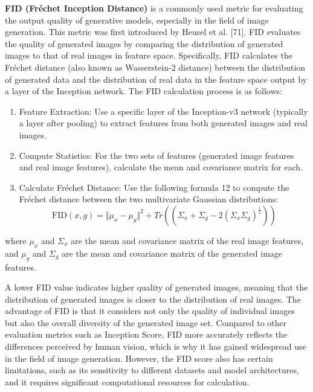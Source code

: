 \textbf{FID (Fréchet Inception Distance)} is a commonly used metric for evaluating the output quality of generative models, especially in the field of image generation. This metric was first introduced by Heusel et al. [71]. FID evaluates the quality of generated images by comparing the distribution of generated images to that of real images in feature space. Specifically, FID calculates the Fréchet distance (also known as Wasserstein-2 distance) between the distribution of generated data and the distribution of real data in the feature space output by a layer of the Inception network. The FID calculation process is as follows:
\begin{enumerate}
    \item  Feature Extraction: Use a specific layer of the Inception-v3 network (typically a layer after pooling) to extract features from both generated images and real images.
    \item Compute Statistics: For the two sets of features (generated image features and real image features), calculate the mean and covariance matrix for each.
    \item Calculate Fréchet Distance: Use the following formula 12 to compute the Fréchet distance between the two multivariate Gaussian distributions:
    \begin{equation}
        \label{FID_equation}
        \text{FID}(x, g) = \Vert\mu_x - \mu_g\Vert^2 + Tr\left((\Sigma_x + \Sigma_g - 2(\Sigma_x\Sigma_g)^{\frac{1}{2}})\right)
    \end{equation}
\end{enumerate}
where $ \mu_x$ and $\Sigma_x $ are the mean and covariance matrix of the real image features, and $\mu_g$ and $\Sigma_g$ are the mean and covariance matrix of the generated image features.

A lower FID value indicates higher quality of generated images, meaning that the distribution of generated images is closer to the distribution of real images. The advantage of FID is that it considers not only the quality of individual images but also the overall diversity of the generated image set. Compared to other evaluation metrics such as Inception Score, FID more accurately reflects the differences perceived by human vision, which is why it has gained widespread use in the field of image generation. However, the FID score also has certain limitations, such as its sensitivity to different datasets and model architectures, and it requires significant computational resources for calculation.

